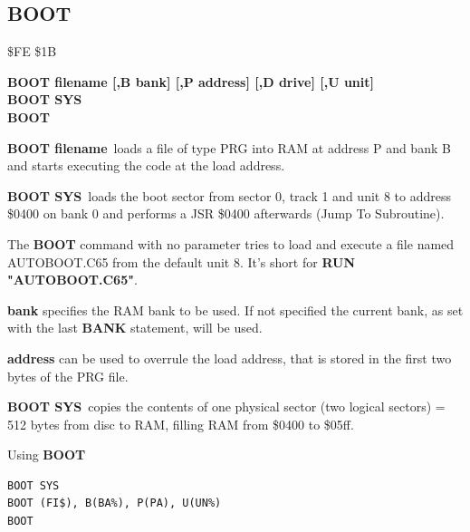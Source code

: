 
\newpage
\subsection{BOOT}
\begin{description}[leftmargin=2cm,style=nextline]
\item [Token:] \$FE \$1B
\item [Format:] {\bf BOOT filename [,B bank]
                [,P address]  [,D drive] [,U unit] } \\
                {\bf BOOT SYS} \\
                {\bf BOOT} 
\item [Usage:]
   {\bf BOOT filename} loads a file of type
   PRG into RAM at address P and bank B and starts executing
   the code at the load address.

   {\bf BOOT SYS} loads the boot sector from sector 0,
   track 1 and unit 8 to address \$0400 on bank 0 and
   performs a JSR \$0400 afterwards (Jump To Subroutine).

   The {\bf BOOT} command with no parameter tries to load
   and execute a file named AUTOBOOT.C65 from the default unit 8.
   It's short for {\bf RUN "AUTOBOOT.C65"}.

   \filenamedefinition

   {\bf bank} specifies the RAM bank to be used.
   If not specified the current bank, as set with the last
   {\bf BANK} statement, will be used.

   {\bf address} can be used to overrule the load address,
   that is stored in the first two bytes of the PRG file.

   \drivedefinition

   \unitdefinition

\item [Remarks:]
   {\bf BOOT SYS} copies the contents of one physical sector
   (two logical sectors) = 512 bytes from disc to RAM,
   filling RAM from \$0400 to \$05ff.

\item [Example:] Using {\bf BOOT}
\begin{tcolorbox}[colback=black,coltext=white]
\verbatimfont{\codefont}
\begin{verbatim}
BOOT SYS
BOOT (FI$), B(BA%), P(PA), U(UN%)
BOOT
\end{verbatim}
\end{tcolorbox}
\end{description}

